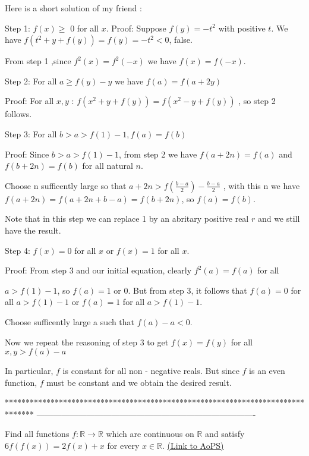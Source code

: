 \begin{solution}
	Here is a short solution of my friend :

Step 1: $ f(x) \geq$ 0 for all $ x$.
Proof: Suppose $ f(y) = - t^2$ with positive $ t$.
We have $ f( t ^ 2 + y + f (y ) ) = f(y) = - t^2 < 0$, false.

From step 1 ,since $ f^ 2 ( x ) = f^2 ( - x )$ we have $ f(x) = f( - x)$.


Step 2: For all $ a \geq f(y) - y$ we have $ f(a) = f(a + 2y)$

Proof: For all $ x,y$ :
$ f ( x^ 2 + y + f ( y ) ) = f ( x^ 2 - y + f ( y ) )$ , so step 2 follows.

Step 3: For all $ b > a > f(1) - 1, f(a) = f(b)$

Proof: Since $ b > a > f(1) - 1$, from step 2 we have $ f(a + 2n) = f(a)$ and $ f(b + 2n) = f(b)$ for all natural $ n$. 

Choose n sufficently large so that $ a + 2n > f( \frac {b - a} {2} ) - \frac {b - a} {2}$ , with this n we have $ f(a + 2n) = f(a + 2n + b - a) = f(b + 2n)$, so 
$ f(a) = f(b)$. 

Note that in this step we can replace 1 by an abritary positive real $ r$ and we still have the result.

Step 4: $ f(x) = 0$ for all $ x$ or $ f(x) = 1$ for all $ x$.

Proof: From step 3 and our initial equation, clearly $ f ^ 2 ( a ) = f(a)$ for all 

$ a > f(1) - 1$, so $ f(a) = 1$ or $ 0$. But from step 3, it follows that $ f(a) = 0$ for all $ a > f(1) - 1$ or $ f(a) = 1$ for all $ a > f(1) - 1.$

Choose sufficently large a such that $ f(a) - a < 0$.

Now we repeat the reasoning of step 3 to get $ f(x) = f(y)$ for all $ x,y > f(a) - a$

In particular, $ f$ is constant for all non - negative reals. But since $ f$ is an even function, $ f$ must be constant and we obtain the desired result.
\end{solution}
*******************************************************************************
-------------------------------------------------------------------------------

\begin{problem}
	Find all functions $ f: \mathbb{R}\to\mathbb{R}$ which are continuous on $ \mathbb{R}$ and satisfy $ 6f(f(x)) = 2f(x) + x$ for every $ x\in \mathbb{R}$.
	\flushright \href{https://artofproblemsolving.com/community/c6h306191}{(Link to AoPS)}
\end{problem}



